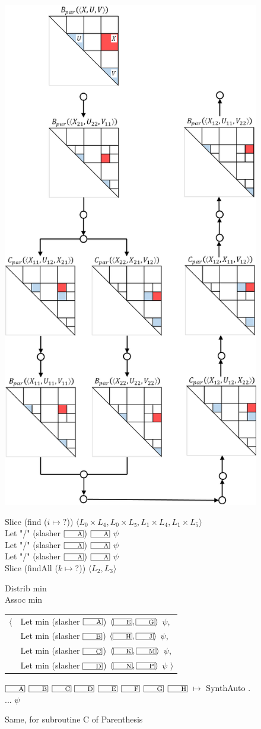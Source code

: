 \begin{figure}
\begin{center}
\includegraphics[width=.3\textwidth]{img/par-B.pdf}
\end{center}
%
\begin{transcript}
Slice (find ($i \mapsto {?}$)) $\langle L_0\times L_4, L_0\times L₅, L_1\times L_4, L_1\times L_5\rangle$ \\
Let "/" (slasher $\lbox A$) $\lbox A$ $\psi$ \\
Let "/" (slasher $\lbox A$) $\lbox A$ $\psi$ \\
Let "/" (slasher $\lbox A$) $\lbox A$ $\psi$ \\
Slice (findAll ($k \mapsto {?}$)) $\langle L_2, L_3\rangle$

Distrib min \\
Assoc min

\begin{tabular}{@{}l@{~}l@{}}
$\langle$ & Let min (slasher $\lbox A$) $\langle\lbox E, \lbox G\rangle$ $\psi$, \\
& Let min (slasher $\lbox B$) $\langle\lbox H,\lbox J\rangle$ $\psi$, \\
& Let min (slasher $\lbox C$) $\langle\lbox K,\lbox M\rangle$ $\psi$, \\
& Let min (slasher $\lbox D$) $\langle\lbox N,\lbox P\rangle$ $\psi$ $\rangle$
\end{tabular}

$\lbox A$ $\lbox B$ $\lbox C$ $\lbox D$
$\lbox E$ $\lbox F$ $\lbox G$ $\lbox H$ 
$\mapsto$ SynthAuto . ... $\psi$
\end{transcript}
\caption{Same, for subroutine C of Parenthesis}
\end{figure}

\vfill

